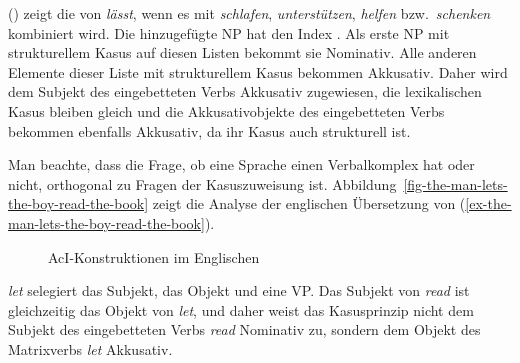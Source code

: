 () zeigt die \argstl von \emph{lässt}, wenn es mit \emph{schlafen},
\emph{unterstützen}, \emph{helfen} bzw.\ \emph{schenken} kombiniert wird.
\ea
{}
\z
Die hinzugefügte NP hat den Index . Als erste NP mit strukturellem Kasus auf diesen Listen
bekommt sie Nominativ. Alle anderen Elemente dieser Liste mit strukturellem Kasus bekommen Akkusativ. Daher wird dem
Subjekt des eingebetteten Verbs Akkusativ zugewiesen, die lexikalischen Kasus bleiben gleich und die
Akkusativobjekte des eingebetteten Verbs bekommen ebenfalls Akkusativ, da ihr Kasus auch strukturell ist.

Man beachte, dass die Frage, ob eine Sprache einen Verbalkomplex hat oder nicht, orthogonal zu Fragen der
Kasuszuweisung ist. Abbildung~\vref{fig-the-man-lets-the-boy-read-the-book} zeigt die Analyse der englischen Übersetzung von (\ref{ex-the-man-lets-the-boy-read-the-book}).
\begin{figure}
\caption{\label{fig-the-man-lets-the-boy-read-the-book}AcI-Konstruktionen im Englischen}
\end{figure}
\emph{let} selegiert das Subjekt, das Objekt und eine VP. Das Subjekt von \emph{read} ist
gleichzeitig das Objekt von \emph{let}, und daher weist das Kasusprinzip nicht dem
Subjekt des eingebetteten Verbs \emph{read} Nominativ zu, sondern dem Objekt des Matrixverbs \emph{let} Akkusativ.%

